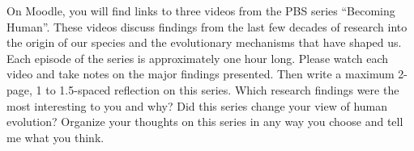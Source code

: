 On Moodle, you will find links to three videos from the PBS series “Becoming	Human”.
These videos discuss findings from the last few decades of research into the origin of our species and the evolutionary mechanisms that have shaped us.
Each episode of the series is approximately
one hour long.
Please watch each video and take notes on the major findings presented.
Then write a maximum 2-page, 1 to 1.5-spaced reflection on this series.
Which research findings were the most interesting to you and why?
Did this series change your view of human evolution?
Organize your thoughts on this series in any way you choose and tell me what you think.
